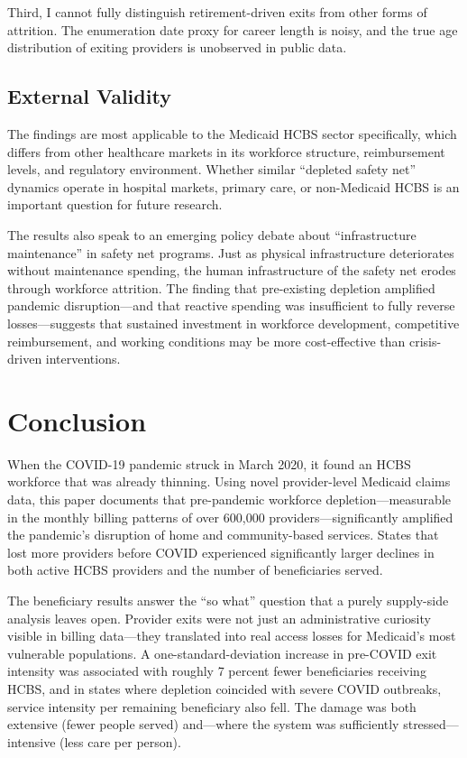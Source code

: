 \documentclass[12pt]{article}
\begin{document}
Third, I cannot fully distinguish retirement-driven exits from other forms of attrition. The enumeration date proxy for career length is noisy, and the true age distribution of exiting providers is unobserved in public data.

\subsection{External Validity}

The findings are most applicable to the Medicaid HCBS sector specifically, which differs from other healthcare markets in its workforce structure, reimbursement levels, and regulatory environment. Whether similar ``depleted safety net'' dynamics operate in hospital markets, primary care, or non-Medicaid HCBS is an important question for future research.

The results also speak to an emerging policy debate about ``infrastructure maintenance'' in safety net programs. Just as physical infrastructure deteriorates without maintenance spending, the human infrastructure of the safety net erodes through workforce attrition. The finding that pre-existing depletion amplified pandemic disruption---and that reactive spending was insufficient to fully reverse losses---suggests that sustained investment in workforce development, competitive reimbursement, and working conditions may be more cost-effective than crisis-driven interventions.


\section{Conclusion}

When the COVID-19 pandemic struck in March 2020, it found an HCBS workforce that was already thinning. Using novel provider-level Medicaid claims data, this paper documents that pre-pandemic workforce depletion---measurable in the monthly billing patterns of over 600,000 providers---significantly amplified the pandemic's disruption of home and community-based services. States that lost more providers before COVID experienced significantly larger declines in both active HCBS providers and the number of beneficiaries served.

The beneficiary results answer the ``so what'' question that a purely supply-side analysis leaves open. Provider exits were not just an administrative curiosity visible in billing data---they translated into real access losses for Medicaid's most vulnerable populations. A one-standard-deviation increase in pre-COVID exit intensity was associated with roughly 7 percent fewer beneficiaries receiving HCBS, and in states where depletion coincided with severe COVID outbreaks, service intensity per remaining beneficiary also fell. The damage was both extensive (fewer people served) and---where the system was sufficiently stressed---intensive (less care per person).
\end{document}
